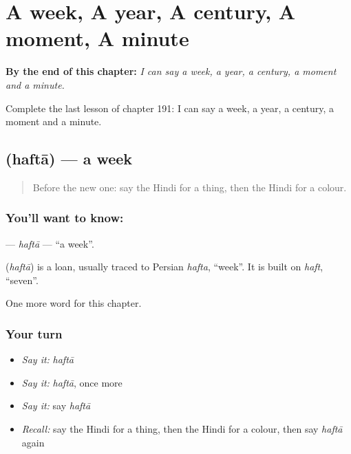 
\chapter{A week, A year, A century, A moment, A minute}
\label{ch:hi-a-week-a-year-a-century-a-moment-a-minute}

\begin{chapteropening}
\textbf{By the end of this chapter:} \emph{I can say a week, a year, a century, a moment and a minute.}

Complete the last lesson of chapter 191: I can say a week, a year, a century, a moment and a minute.
\end{chapteropening}

\section[\texorpdfstring{\hi{हफ़्ता} (haftā)}{हफ़्ता (haftā)}]{ (haftā) — a week}

\label{lesson:HI-C191-hafta}



\begin{quote}
Before the new one: say the Hindi for a thing, then the Hindi for a colour.
\end{quote}

\subsection*{You'll want to know: }
\textbf{} — \emph{haftā} — \textquotedblleft{}a week\textquotedblright{}.

\begin{cousinweb}
\textbf{} (\emph{haftā}) is a loan, usually traced to Persian \emph{hafta}, \textquotedblleft{}week\textquotedblright{}. It is built on \emph{haft}, \textquotedblleft{}seven\textquotedblright{}.
\end{cousinweb}

\begin{grammarlens}[title={What you've built}]
One more word for this chapter.
\end{grammarlens}

\subsection*{Your turn}
\begin{itemize}
\raggedright
  \item \emph{Say it:} \emph{haftā}
  \item \emph{Say it:} \emph{haftā}, once more
  \item \emph{Say it:} say \emph{haftā}
  \item \emph{Recall:} say the Hindi for a thing, then the Hindi for a colour, then say \emph{haftā} again
\end{itemize}

